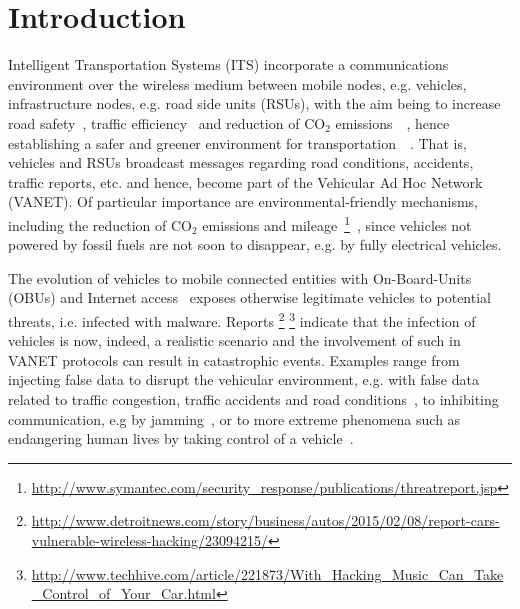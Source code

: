 \documentclass[conference]{IEEEtran}
\begin{document}
\IEEEpeerreviewmaketitle

\section{Introduction}
Intelligent Transportation Systems (ITS) incorporate a communications environment over the wireless medium 
between mobile nodes, e.g. vehicles, infrastructure nodes, e.g. road side units (RSUs), with the aim being to increase road safety~\cite{joerer2014vehicular}, \cite{yang2004vehicle}
traffic efficiency~\cite{mariano2015solution} and reduction of CO$_2$ emissions~\cite{maglaras2013exploiting}~\cite{santamaria2015safety}, hence establishing a safer and greener environment for 
transportation~\cite{barba2012smart}~\cite{tsugawa2010energy}. That is, vehicles and RSUs broadcast messages regarding road conditions, accidents, traffic reports, etc. and hence, 
become part of the Vehicular Ad Hoc Network (VANET). 
 Of particular importance are environmental-friendly mechanisms, including 
the reduction of CO$_2$ emissions and mileage~\footnote{\url{http://www.symantec.com/security_response/publications/threatreport.jsp}}~\cite{souza2014decreasing}, since vehicles not powered by fossil fuels are not soon to disappear, e.g. by fully electrical vehicles.



The evolution of vehicles to 
mobile connected entities with On-Board-Units (OBUs) and Internet access~\cite{remy2011lte4v2x} exposes otherwise legitimate vehicles to potential threats, i.e. infected with malware. Reports 
\footnote{\url{http://www.detroitnews.com/story/business/autos/2015/02/08/report-cars-vulnerable-wireless-hacking/23094215/}}
\footnote{\url{http://www.techhive.com/article/221873/With_Hacking_Music_Can_Take_Control_of_Your_Car.html}} indicate that the infection of vehicles is now,
indeed, a realistic scenario and the involvement of such in VANET protocols can result in catastrophic events. Examples range from injecting false data to disrupt
the vehicular environment, e.g. with false data related to traffic congestion, traffic accidents and road conditions~\cite{garip2015congestion}, to inhibiting communication, e.g by jamming~\cite{Punal_2015}, or to  more 
extreme phenomena such as endangering human lives by taking control of a vehicle~\cite{domingo2009safety}.


  
\end{document}
